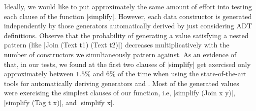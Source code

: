 Ideally, we would like to put approximately the same amount of effort into
testing each clause of the function |simplify|.
%
However, each data constructor is generated independently by those generators
automatically derived by just considering ADT definitions.
Observe that the probability of generating a value satisfying a nested pattern
(like |Join (Text t1) (Text t2)|) decreases multiplicatively with the number of
constructors we simultaneously pattern against.
%
As an evidence of that, in our tests, we found at the first two clauses of
|simplify| get exercised only approximately between $1.5\%$ and $6\%$ of the
time when using the state-of-the-art tools for automatically deriving
\quickcheck generators \megadeth \cite{GriecoCB16} and {\dragen}
\cite{DBLP:conf/haskell/MistaRH18}.
%
Most of the generated values were exercising the simplest clauses of our
function, i.e, |simplify (Join x y)|, |simplify (Tag t x)|, and |simplify x|.







